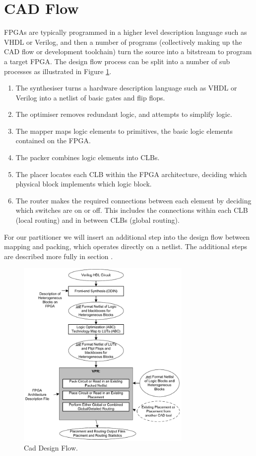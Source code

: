 \documentclass[12pt,final,oneside]{dwThesis} %
\begin{document}
\section{\acs{CAD} Flow}
\acp{FPGA} are typically programmed in a higher level description language such as VHDL or Verilog, and then a number of programs (collectively making up the \ac{CAD} flow or development toolchain) turn the source into a bitstream to program a target \ac{FPGA}.
The design flow process can be split into a number of sub processes as illustrated in Figure \ref{CADFlow}\cite{VPRBook,VPRManual,FPGAArch}.
\begin{enumerate}
    \item The synthesiser turns a hardware description language such as VHDL or Verilog into a netlist of basic gates and flip flops.
    \item The optimiser removes redundant logic, and attempts to simplify logic.
    \item The mapper maps logic elements to primitives, the basic logic elements contained on the \ac{FPGA}.
    \item The packer combines logic elements into \acp{CLB}.
    \item The placer locates each \ac{CLB} within the \ac{FPGA} architecture, deciding which physical block implements which logic block.
    \item The router makes the required connections between each element by deciding which switches are on or off. This includes the connections within each \ac{CLB} (local routing) and in between \acp{CLB} (global routing).
\end{enumerate}
For our partitioner we will insert an additional step into the design flow between mapping and packing, which operates directly on a netlist. The additional steps are described more fully in section .

\begin{figure}
    \begin{center}
        \includegraphics[width=0.75\textwidth]{images/vpr-cad.png}
        \caption{Cad Design Flow.\cite{VPRManual}}
        \label{CADFlow}
    \end{center}
\end{figure}
\end{document}

